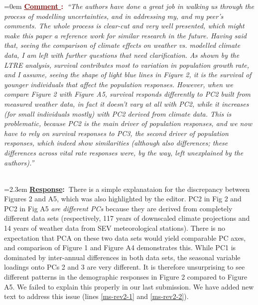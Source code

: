 \documentclass[12pt]{article}
\newcounter{cN}
\newcommand{\comment}[1]{
	\vspace{2em}
	\refstepcounter{cN} %
	\noindent \hangindent=0em \textbf{\textcolor{Maroon}{\uline{Comment \thecN}:~}}\emph{``#1''}
	}
\newcommand{\response}[1]{
	\\[0.25em]
	\hangindent=2.3em \textbf{\textcolor{NavyBlue}{\uline{Response}:~}}#1
	}
\begin{document}
\comment{The authors have done a great job in walking us through the process of modelling uncertainties, and in addressing my, and my peer's comments. The whole process is clear-cut and very well presented, which might make this paper a reference work for similar research in the future.
Having said that, seeing the comparison of climate effects on weather vs. modelled climate data, I am left with further questions that need clarification. As shown by the LTRE analysis, survival contributes most to variation in population growth rate, and I assume, seeing the shape of light blue lines in Figure 2, it is the survival of younger individuals that affect the population responses. However, when we compare Figure 2 with Figure A5, survival responds differently to PC2 built from measured weather data, in fact it doesn't vary at all with PC2, while it increases (for small individuals mostly) with PC2 derived from climate data. This is problematic, because PC2 is the main driver of population responses, and we now have to rely on survival responses to PC3, the second driver of population responses, which indeed show similarities (although also differences; these differences across vital rate responses were, by the way, left unexplained by the authors).}
\response{There is a simple explanataion for the discrepancy between Figures 2 and A5, which was also highlighted by the editor. 
PC2 in Fig 2 and PC2 in Fig A5 \textit{are different PCs} because they are derived from completely different data sets (respectively, 117 years of downscaled climate projections and 14 years of weather data from SEV meteorological stations).
There is no expectation that PCA on these two data sets would yield comparable PC axes, and comparison of Figure 1 and Figure A4 demonstrates this. 
While PC1 is dominated by inter-annual differences in both data sets, the seasonal variable loadings onto PCs 2 and 3 are very different. 
It is therefore unsurprising to see different patterns in the demographic responses in Figure 2 compared to Figure A5. 
We failed to explain this properly in our last submission. 
We have added new text to address this issue (lines \ref{ms-rev2-1} and \ref{ms-rev2-2}).
}
\end{document}
